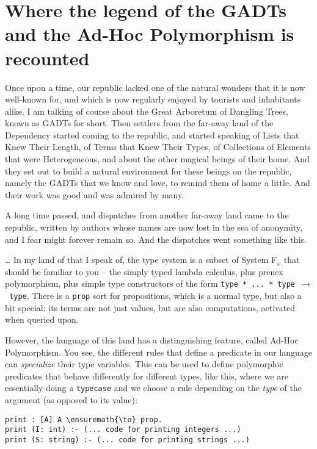 \section{Where the legend of the GADTs and the Ad-Hoc Polymorphism is
recounted}\label{where-the-legend-of-the-gadts-and-the-ad-hoc-polymorphism-is-recounted}

\identNormal\it

Once upon a time, our republic lacked one of the natural wonders that it
is now well-known for, and which is now regularly enjoyed by tourists
and inhabitants alike. I am talking of course about the Great Arboretum
of Dangling Trees, known as GADTs for short. Then settlers from the
far-away land of the Dependency started coming to the republic, and
started speaking of Lists that Knew Their Length, of Terms that Knew
Their Types, of Collections of Elements that were Heterogeneous, and
about the other magical beings of their home. And they set out to build
a natural environment for these beings on the republic, namely the GADTs
that we know and love, to remind them of home a little. And their work
was good and was admired by many.

A long time passed, and dispatches from another far-away land came to
the republic, written by authors whose names are now lost in the sea of
anonymity, and I fear might forever remain so. And the dispatches went
something like this.

\rm

\heroAUTHOR{} \ldots{} In my land of \lamprolog that I speak of, the type
system is a subset of System F\(_\omega\) that should be familiar to you
-- the simply typed lambda calculus, plus prenex polymorphism, plus
simple type constructors of the form
\texttt{type\ *\ ...\ *\ type\ \ensuremath{\to}\ type}. There is a
\texttt{prop} sort for propositions, which is a normal type, but also a
bit special: its terms are not just values, but are also computations,
activated when queried upon.

However, the language of this land has a distinguishing feature, called
Ad-Hoc Polymorphism. You see, the different rules that define a
predicate in our language can \emph{specialize} their type variables.
This can be used to define polymorphic predicates that behave
differently for different types, like this, where we are essentially
doing a \texttt{typecase} and we choose a rule depending on the
\emph{type} of the argument (as opposed to its value):

\begin{verbatim}
print : [A] A \ensuremath{\to} prop.
print (I: int) :- (... code for printing integers ...)
print (S: string) :- (... code for printing strings ...)
\end{verbatim}

